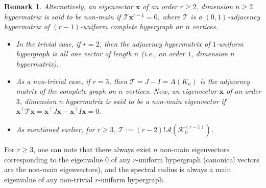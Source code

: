 \documentclass[10pt,a4paper]{article}
\newtheorem{remark}{Remark}[section]
\begin{document}
	\begin{remark}
		Alternatively, an eigenvector $\mathbf{x}$ of an order $r \geq 2$, dimension $n \geq 2$ hypermatrix is said to be non-main if $\mathcal{T} \mathbf{x}^{r-1} = 0$,
		where $\mathcal{T}$ is a $(0,1)$-adjacency hypermatrix of $(r-1)$-uniform complete hypergraph on $n$ vertices.
		
		\begin{itemize}
			\item In the trivial case, if $r=2$, then the adjacency hypermatrix of $1$-uniform hypergraph is all one vector of length $n$ (i.e., an order $1$, dimension $n$ hypermatrix).
			\item As a non-trivial case, if $r=3$, then $\mathcal{T}=J-I=A(K_n)$ is the adjacency matrix of the complete graph on $n$ vertices. Now, an eigenvector $\mathbf{x}$ of an order $3$, dimension $n$ hypermatrix is said to be a non-main eigenvector if $\mathbf{x}^\intercal \mathcal{T} \mathbf{x} = \mathbf{x}^\intercal J \mathbf{x} - \mathbf{x}^\intercal I \mathbf{x} =0. $
			\item  As mentioned earlier, for $r \geq 3$, $\mathcal{T} := (r-2)! \mathcal{A}(\mathcal{K}_n^{(r-1)})$.
		\end{itemize}
	\end{remark}
	
	For $r\geq 3$, one can note that there always exist $n$ non-main eigenvectors corresponding to the eigenvalue $0$ of any $r$-uniform hypergraph (canonical vectors are the non-main eigenvectors), and the spectral radius is always a main eigenvalue of any non-trivial $r$-uniform hypergraph. 
	
\end{document}
